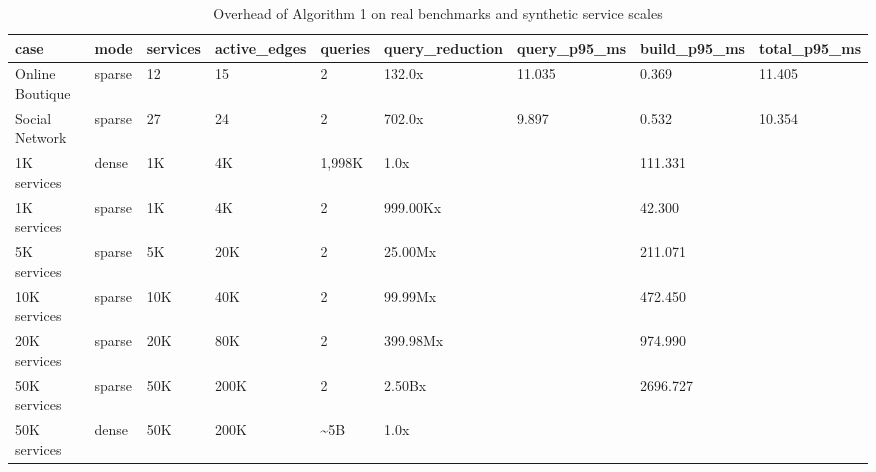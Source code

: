 \begin{table}[t]
\centering
\caption{Overhead of Algorithm 1 on real benchmarks and synthetic service scales}
\label{tab:gda_scalability_overhead_revised}
\scriptsize
\begin{tabular}{lllllllll}
\toprule
case & mode & services & active\_edges & queries & query\_reduction & query\_p95\_ms & build\_p95\_ms & total\_p95\_ms \\
\midrule
Online Boutique & sparse & 12 & 15 & 2 & 132.0x & 11.035 & 0.369 & 11.405 \\
Social Network & sparse & 27 & 24 & 2 & 702.0x & 9.897 & 0.532 & 10.354 \\
1K services & dense & 1K & 4K & 1,998K & 1.0x &  & 111.331 &  \\
1K services & sparse & 1K & 4K & 2 & 999.00Kx &  & 42.300 &  \\
5K services & sparse & 5K & 20K & 2 & 25.00Mx &  & 211.071 &  \\
10K services & sparse & 10K & 40K & 2 & 99.99Mx &  & 472.450 &  \\
20K services & sparse & 20K & 80K & 2 & 399.98Mx &  & 974.990 &  \\
50K services & sparse & 50K & 200K & 2 & 2.50Bx &  & 2696.727 &  \\
50K services & dense & 50K & 200K & \textasciitilde{}5B & 1.0x &  &  &  \\
\bottomrule
\end{tabular}
\end{table}
